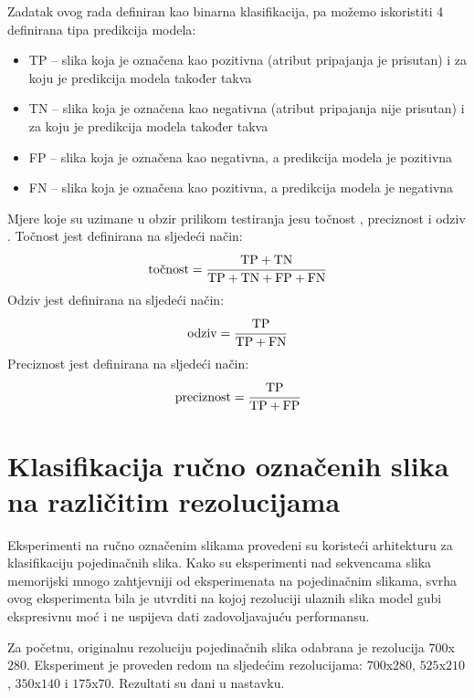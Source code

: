 \documentclass[times, utf8, diplomski, numeric]{fer}
\begin{document}
Zadatak ovog rada definiran kao binarna klasifikacija, pa možemo iskoristiti 4 definirana tipa predikcija modela: 
\begin{itemize}
 \item TP  -- slika koja je označena kao pozitivna (atribut pripajanja je prisutan) i za koju je predikcija modela također takva 
 \item TN  -- slika koja je označena kao negativna (atribut pripajanja nije prisutan) i za koju je predikcija modela također takva
 \item FP  -- slika koja je označena kao negativna, a predikcija modela je pozitivna
 \item FN  -- slika koja je označena kao pozitivna, a predikcija modela je negativna
\end{itemize}
Mjere koje su uzimane u obzir prilikom testiranja jesu točnost , preciznost  i odziv . 
Točnost jest definirana na sljedeći način:
\begin{align}
 \text{točnost} = \cfrac{\text{TP} + \text{TN}}{\text{TP} + \text{TN} + \text{FP} + \text{FN}}
\end{align}
Odziv jest definirana na sljedeći način:
\begin{align}
 \text{odziv} = \cfrac{\text{TP}}{\text{TP} + \text{FN}}
\end{align}
Preciznost jest definirana na sljedeći način:
\begin{align}
 \text{preciznost} = \cfrac{\text{TP}}{\text{TP} + \text{FP}}
\end{align}

\section{Klasifikacija ručno označenih slika na različitim rezolucijama}
Eksperimenti na ručno označenim slikama provedeni su koristeći arhitekturu za klasifikaciju pojedinačnih slika. 
Kako su eksperimenti nad sekvencama slika memorijski mnogo zahtjevniji od eksperimenata na pojedinačnim slikama, svrha ovog eksperimenta bila je utvrditi
na kojoj rezoluciji ulaznih slika model gubi ekspresivnu moć i ne uspijeva dati zadovoljavajuću performansu.

Za početnu, originalnu rezoluciju pojedinačnih slika odabrana je rezolucija $700$x$280$. Eksperiment je proveden redom na sljedećim rezolucijama:
$700$x$280$, $525$x$210$, $350$x$140$ i $175$x$70$. Rezultati su dani u nastavku.
\end{document}
